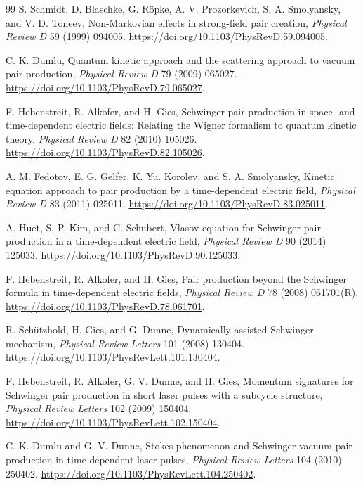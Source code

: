 \documentclass[anonymous]{iopjournal}
\begin{document}
\begin{thebibliography}{99}
S. Schmidt, D. Blaschke, G. R\"opke, A. V. Prozorkevich, S. A. Smolyansky, and V. D. Toneev, Non-Markovian effects in strong-field pair creation, \textit{Physical Review D} 59 (1999) 094005. \url{https://doi.org/10.1103/PhysRevD.59.094005}.

C. K. Dumlu, Quantum kinetic approach and the scattering approach to vacuum pair production, \textit{Physical Review D} 79 (2009) 065027. \url{https://doi.org/10.1103/PhysRevD.79.065027}.

F. Hebenstreit, R. Alkofer, and H. Gies, Schwinger pair production in space- and time-dependent electric fields: Relating the Wigner formalism to quantum kinetic theory, \textit{Physical Review D} 82 (2010) 105026. \url{https://doi.org/10.1103/PhysRevD.82.105026}.

A. M. Fedotov, E. G. Gelfer, K. Yu. Korolev, and S. A. Smolyansky, Kinetic equation approach to pair production by a time-dependent electric field, \textit{Physical Review D} 83 (2011) 025011. \url{https://doi.org/10.1103/PhysRevD.83.025011}.

A. Huet, S. P. Kim, and C. Schubert, Vlasov equation for Schwinger pair production in a time-dependent electric field, \textit{Physical Review D} 90 (2014) 125033. \url{https://doi.org/10.1103/PhysRevD.90.125033}.

F. Hebenstreit, R. Alkofer, and H. Gies, Pair production beyond the Schwinger formula in time-dependent electric fields, \textit{Physical Review D} 78 (2008) 061701(R). \url{https://doi.org/10.1103/PhysRevD.78.061701}.

R. Sch\"utzhold, H. Gies, and G. Dunne, Dynamically assisted Schwinger mechanism, \textit{Physical Review Letters} 101 (2008) 130404. \url{https://doi.org/10.1103/PhysRevLett.101.130404}.

F. Hebenstreit, R. Alkofer, G. V. Dunne, and H. Gies, Momentum signatures for Schwinger pair production in short laser pulses with a subcycle structure, \textit{Physical Review Letters} 102 (2009) 150404. \url{https://doi.org/10.1103/PhysRevLett.102.150404}.

C. K. Dumlu and G. V. Dunne, Stokes phenomenon and Schwinger vacuum pair production in time-dependent laser pulses, \textit{Physical Review Letters} 104 (2010) 250402. \url{https://doi.org/10.1103/PhysRevLett.104.250402}.


\end{thebibliography}
\end{document}
